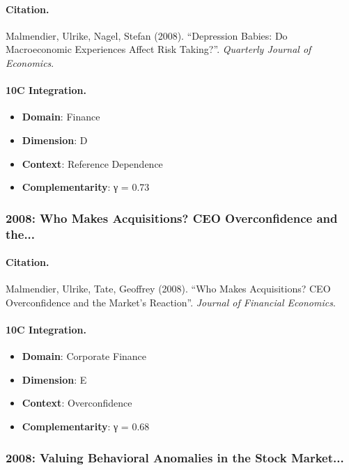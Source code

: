 \paragraph{Citation.}
Malmendier, Ulrike, Nagel, Stefan (2008). ``Depression Babies: Do Macroeconomic Experiences Affect Risk Taking?''. \textit{Quarterly Journal of Economics}.

\paragraph{10C Integration.}
\begin{itemize}[nosep]
  \item \textbf{Domain}: Finance
  \item \textbf{Dimension}: D
  \item \textbf{Context}: Reference Dependence
  \item \textbf{Complementarity}: γ = 0.73
\end{itemize}


\subsubsection{2008: Who Makes Acquisitions? CEO Overconfidence and the...}

\paragraph{Citation.}
Malmendier, Ulrike, Tate, Geoffrey (2008). ``Who Makes Acquisitions? CEO Overconfidence and the Market's Reaction''. \textit{Journal of Financial Economics}.

\paragraph{10C Integration.}
\begin{itemize}[nosep]
  \item \textbf{Domain}: Corporate Finance
  \item \textbf{Dimension}: E
  \item \textbf{Context}: Overconfidence
  \item \textbf{Complementarity}: γ = 0.68
\end{itemize}


\subsubsection{2008: Valuing Behavioral Anomalies in the Stock Market...}

